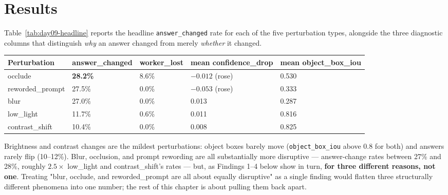 \section{Results}

Table~\ref{tab:day09-headline} reports the headline \texttt{answer\_changed} rate for each of the
five perturbation types, alongside the three diagnostic columns that distinguish \emph{why} an
answer changed from merely \emph{whether} it changed.

\begin{center}
\begin{tabular}{p{3.0cm}p{2.0cm}p{1.7cm}p{3.2cm}p{2.1cm}}
\toprule
\textbf{Perturbation} & \textbf{answer\_\allowbreak changed} & \textbf{worker\_\allowbreak lost} & \textbf{mean confidence\_\allowbreak drop} & \textbf{mean object\_\allowbreak box\_iou} \\
\midrule
occlude & \textbf{28.2\%} & 8.6\% & $-0.012$ (rose) & 0.530 \\
reworded\_\allowbreak prompt & 27.5\% & 0.0\% & $-0.053$ (rose) & 0.333 \\
blur & 27.0\% & 0.0\% & 0.013 & 0.287 \\
low\_light & 11.7\% & 0.6\% & 0.011 & 0.816 \\
contrast\_\allowbreak shift & 10.4\% & 0.0\% & 0.008 & 0.825 \\
\bottomrule
\end{tabular}
\label{tab:day09-headline}
\end{center}

Brightness and contrast changes are the mildest perturbations: object boxes barely move
(\texttt{object\_box\_iou} above 0.8 for both) and answers rarely flip (10--12\%). Blur, occlusion,
and prompt rewording are all substantially more disruptive --- answer-change rates between 27\% and
28\%, roughly $2.5\times$ low\_light and contrast\_shift's rates --- but, as Findings 1--4 below show
in turn, \textbf{for three different reasons, not one}. Treating "blur, occlude, and reworded\_prompt
are all about equally disruptive" as a single finding would flatten three structurally different
phenomena into one number; the rest of this chapter is about pulling them back apart.


